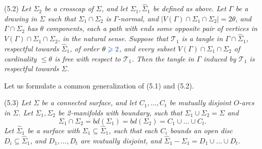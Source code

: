 \stmt
(5.2) \textit{Let $\Sigma_2$ be a crosscap of $\Sigma$, and let $\Sigma_1, \hat{\Sigma}_1$ be defined as above. Let $\Gamma$ be a drawing in $\Sigma$ such that $\Sigma_1 \cap \Sigma_2$ is $\Gamma$-normal, and $|V(\Gamma) \cap \Sigma_1 \cap \Sigma_2| = 2\theta$, and $\Gamma \cap \Sigma_2$ has $\theta$ components, each a path with ends some opposite pair of vertices in $V(\Gamma) \cap \Sigma_1 \cap \Sigma_2$, in the natural sense. Suppose that $\mathscr{T}_1$ is a tangle in $\Gamma \cap \hat{\Sigma}_1$, respectful towards $\hat{\Sigma}_1$, of order $\theta\fix{{} \ge 2}$, and every subset $V(\Gamma) \cap \Sigma_1 \cap \Sigma_2$ of cardinality $\le \theta$ is free with respect to $\mathscr{T}_1$. Then the tangle in $\Gamma$ induced by $\mathscr{T}_1$ is respectful towards $\Sigma$.}

Let us formulate a common generalization of (5.1) and (5.2).

\stmt
(5.3) \textit{Let $\Sigma$ be a connected surface, and let $C_1, \dots, C_t$ be mutually disjoint $O$-arcs in $\Sigma$. Let $\Sigma_1, \Sigma_2$ be 2-manifolds with boundary, such that $\Sigma_1 \cup \Sigma_2 = \Sigma$ and}
\begin{equation*}
\Sigma_1 \cap \Sigma_2 = bd(\Sigma_1) = bd(\Sigma_2) = C_1 \cup \dots \cup C_t.
\end{equation*}
\textit{Let $\hat{\Sigma}_1$ be a surface with $\Sigma_1 \subseteq \hat{\Sigma}_1$, such that each $C_i$ bounds an open disc $D_i \subseteq \hat{\Sigma}_1$, and $D_1, \dots, D_t$ are mutually disjoint, and $\hat{\Sigma}_1 - \Sigma_1 = D_1 \cup \dots \cup D_t$.}
